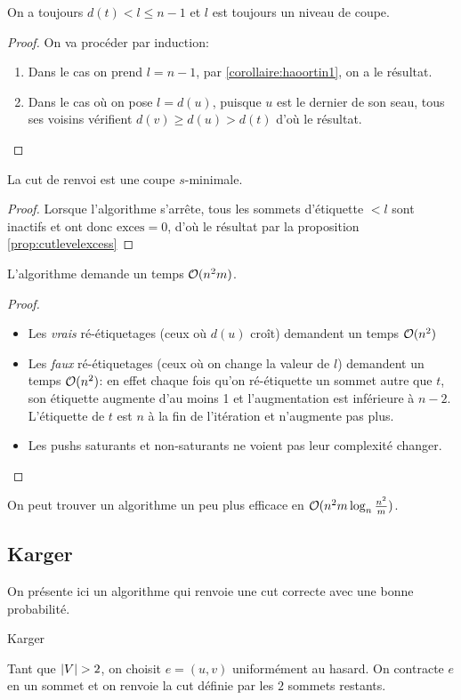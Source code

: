 \documentclass[math, info]{cours}
\begin{document}
\begin{lemme}
	On a toujours $d(t) < l \leq n - 1$ et $l$ est toujours un niveau de coupe.
	\label{lemme:haoortin4}
\end{lemme}
\begin{proof}
	On va procéder par induction:
	\begin{enumerate}
		\item Dans le cas on prend $l = n - 1$, par \ref{corollaire:haoortin1}, on a le résultat.
		\item Dans le cas où on pose $l = d(u)$, puisque $u$ est le dernier de son seau, tous ses voisins vérifient $d(v) \geq d(u) > d(t)$ d'où le résultat.
	\end{enumerate}
\end{proof}

\begin{thm}
	La cut de renvoi est une coupe $s$-minimale.
\end{thm}
\begin{proof}
	Lorsque l'algorithme s'arrête, tous les sommets d'étiquette $< l$ sont inactifs et ont donc $\mathrm{exces} = 0$, d'où le résultat par la proposition \ref{prop:cutlevelexcess}
\end{proof}

\begin{thm}
	L'algorithme demande un temps $\mathcal{O}(n^{2}m)$.
\end{thm}
\begin{proof}
	\begin{itemize}
		\item Les \emph{vrais} ré-étiquetages (ceux où $d(u)$ croît) demandent un temps $\mathcal{O}(n^{2})$
		\item Les \emph{faux} ré-étiquetages (ceux où on change la valeur de $l$) demandent un temps $\mathcal{O}(n^{2})$: en effet chaque fois qu'on ré-étiquette un sommet autre que $t$, son étiquette augmente d'au moins 1 et l'augmentation est inférieure à $n - 2$.
			L'étiquette de $t$ est $n$ à la fin de l'itération et n'augmente pas plus.
		\item Les pushs saturants et non-saturants ne voient pas leur complexité changer.
	\end{itemize}
\end{proof}

On peut trouver un algorithme un peu plus efficace en $\mathcal{O}(n^{2}m\log_{n}\frac{n^{2}}{m})$.

\subsection{Karger}
On présente ici un algorithme qui renvoie une cut correcte avec une bonne probabilité.
\begin{algorithm}
	\caption{Karger}
	Tant que $\left|V\right| > 2$, on choisit $e = (u, v)$ uniformément au hasard. On contracte $e$ en un sommet et on renvoie la cut définie par les $2$ sommets restants.
\end{algorithm}
\end{document}

